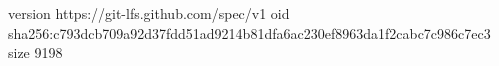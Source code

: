 version https://git-lfs.github.com/spec/v1
oid sha256:c793dcb709a92d37fdd51ad9214b81dfa6ac230ef8963da1f2cabc7c986c7ec3
size 9198
